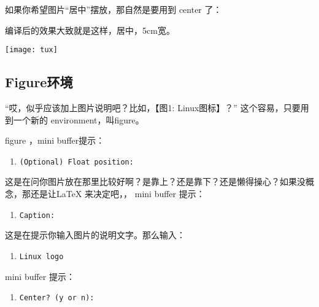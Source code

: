 如果你希望图片“居中”摆放，那自然是要用到 center 了：

\begin{codeblock}[.9]
\end{codeblock}

编译后的效果大致就是这样，居中，5cm宽。

\begin{center}
  \texttt{[image: tux]}
\end{center}

\subsection{Figure环境}
\label{sec:figure}

“哎，似乎应该加上图片说明吧？比如，【图1: Linux图标】？” 这个容易，只要用到一个新的
environment，叫figure。

\Cc\Ce figure \Cj{}，mini buffer提示：
\begin{enumerate}
\item[] \texttt{(Optional) Float position:}
\end{enumerate}

这是在问你图片放在那里比较好啊？是靠上？还是靠下？还是懒得操心？如果没概念，那还是让LaTeX
来决定吧，\Cj{}， mini buffer 提示：

\begin{enumerate}
\item[] \texttt{Caption:}
\end{enumerate}

这是在提示你输入图片的说明文字。那么输入：

\begin{enumerate}
\item[] \texttt{Linux logo}
\end{enumerate}

mini buffer 提示：

\begin{enumerate}
\item[] \texttt{Center? (y or n):} 
\end{enumerate}

